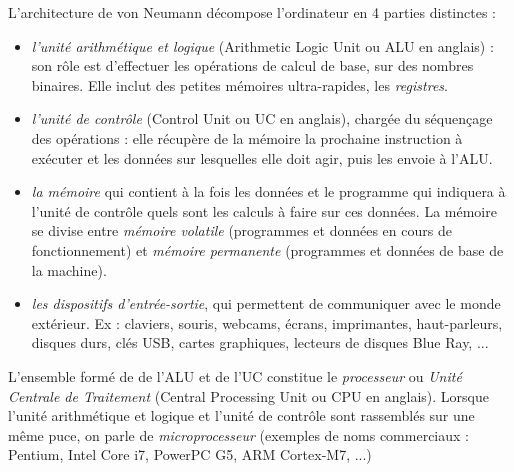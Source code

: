 \documentclass[11pt,a4paper,french,twoside]{PMCours}
\begin{document}
L’architecture de von Neumann décompose l’ordinateur en 4 parties distinctes :
\begin{itemize}
 \item \emph{l’unité arithmétique et logique} (Arithmetic Logic Unit ou ALU en anglais) : son rôle est d’effectuer les opérations de calcul de base, sur des nombres binaires. Elle inclut des petites mémoires ultra-rapides, les \emph{registres}.
 \item \emph{l’unité de contrôle} (Control Unit ou UC en anglais), chargée du séquençage des opérations : elle récupère de la mémoire la prochaine instruction à exécuter et les données sur lesquelles elle doit agir, puis les envoie à l'ALU.
 \item \emph{la mémoire} qui contient à la fois les données et le programme qui indiquera à l’unité de contrôle quels sont les calculs à faire sur ces données. La mémoire se divise entre \emph{mémoire volatile} (programmes et données en cours de fonctionnement) et \emph{mémoire permanente} (programmes et données de base de la machine).
 \item \emph{les dispositifs d’entrée-sortie}, qui permettent de communiquer avec le monde extérieur. Ex : claviers, souris, webcams, écrans, imprimantes, haut-parleurs, disques durs, clés USB, cartes graphiques, lecteurs de disques Blue Ray, ...
\end{itemize}

L'ensemble formé de de l'ALU et de l'UC constitue le \emph{processeur} ou \emph{Unité Centrale de Traitement} (Central Processing Unit ou CPU en anglais). Lorsque l'unité arithmétique et logique et l’unité de contrôle sont rassemblés sur une même puce, on parle de \emph{microprocesseur} (exemples de noms commerciaux : Pentium, Intel Core i7, PowerPC G5, ARM Cortex-M7, ...)
\end{document}
